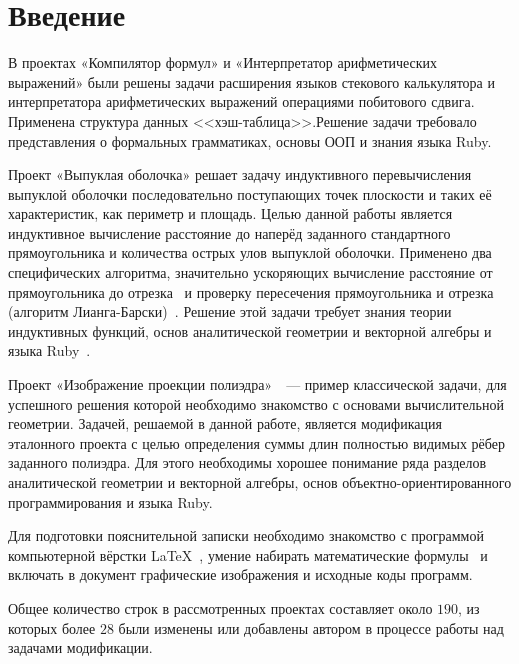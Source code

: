 \section{Введение}

В проектах «Компилятор формул» и «Интерпретатор арифметических
выражений» были решены задачи расширения языков стекового калькулятора
и интерпретатора арифметических выражений операциями побитового сдвига.
Применена структура данных <<хэш-таблица>>.Решение задачи требовало представления
о формальных грамматиках, основы ООП и знания языка Ruby.

Проект «Выпуклая оболочка»\cite{convex} решает задачу индуктивного
перевычисления выпуклой оболочки последовательно поступающих точек плоскости и
таких её характеристик, как периметр и площадь. Целью данной работы является
индуктивное вычисление расстояние до наперёд заданного стандартного прямоугольника
и количества острых улов выпуклой оболочки. Применено два специфических алгоритма,
значительно ускоряющих вычисление расстояние от прямоугольника до
отрезка~\cite{seginters} и проверку пересечения прямоугольника и
отрезка (алгоритм Лианга-Барски)~\cite{barsky}. Решение этой задачи требует знания
теории индуктивных функций, основ аналитической геометрии и векторной алгебры
и языка Ruby~\cite{ruby}.

Проект «Изображение проекции полиэдра»~\cite{polyedr}~--- пример
классической задачи, для успешного решения которой необходимо знакомство с
основами вычислительной геометрии. Задачей, решаемой в данной работе, является
модификация эталонного проекта с целью определения суммы длин полностью видимых
рёбер заданного полиэдра. Для этого необходимы хорошее понимание ряда разделов
аналитической геометрии и векторной алгебры, основ объектно-ориентированного
программирования и языка Ruby.

Для подготовки пояснительной записки необходимо знакомство с программой компьютерной вёрстки \LaTeX~\cite{rlatex}, умение набирать математические формулы~\cite{texbook} и включать в документ графические изображения и исходные
коды программ.

Общее количество строк в рассмотренных проектах составляет около $190$, из которых
более $28$ были изменены или добавлены автором в процессе работы
над задачами модификации.
